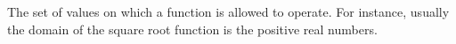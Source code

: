 The set of values on which a function is allowed to operate.
For instance, usually the domain of the square root function
is the positive real numbers.